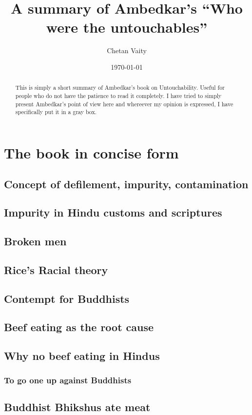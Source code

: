\documentclass{article}
\begin{document}
\title{A summary of Ambedkar's ``Who were the untouchables''}
\author{Chetan Vaity}
\date{\today}
\maketitle

\begin{abstract}
This is simply a short summary of Ambedkar's book on Untouchability\cite{ambedkar1}. Useful for people who do not have the patience to read it completely. I have tried to simply present Ambedkar's point of view here and whereever my opinion is expressed, I have specifically put it in a gray box.
\end{abstract}

\section{The book in concise form}
\subsection{Concept of defilement, impurity, contamination}
\subsection{Impurity in Hindu customs and scriptures}
\subsection{Broken men}
\subsection{Rice's Racial theory}
\subsection{Contempt for Buddhists}
\subsection{Beef eating as the root cause}
\subsection{Why no beef eating in Hindus}
\subsubsection{To go one up against Buddhists}
\subsection{Buddhist Bhikshus ate meat}
\end{document}
